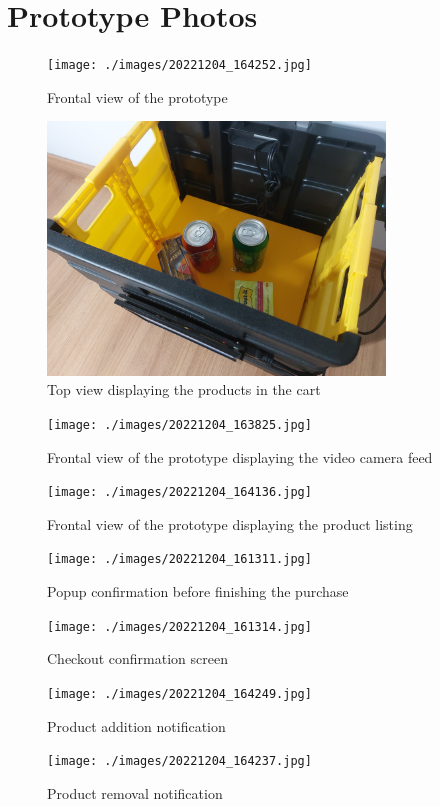 \documentclass[openright]{normas-utf-tex} %
\begin{document}
\apendice
\chapter{Prototype Photos}
\label{app:photos}

\begin{figure}[H]
	\centering
	\texttt{[image: ./images/20221204\_164252.jpg]}
	\caption[]{Frontal view of the prototype}
\end{figure}

\begin{figure}[H]
	\centering
    \includegraphics[width=0.8\textwidth]{./images/20221204_164147.jpg}
	\caption[]{Top view displaying the products in the cart}
\end{figure}

\begin{figure}[H]
	\centering
    \texttt{[image: ./images/20221204\_163825.jpg]}
	\caption[]{Frontal view of the prototype displaying the video camera feed}
\end{figure}

\begin{figure}[H]
	\centering
    \texttt{[image: ./images/20221204\_164136.jpg]}
	\caption[]{Frontal view of the prototype displaying the product listing}
\end{figure}

\begin{figure}[H]
	\centering
    \texttt{[image: ./images/20221204\_161311.jpg]}
    \caption[]{Popup confirmation before finishing the purchase}
\end{figure}

\begin{figure}[H]
	\centering
    \texttt{[image: ./images/20221204\_161314.jpg]}
	\caption[]{Checkout confirmation screen}
\end{figure}


\begin{figure}[H]
	\centering
    \texttt{[image: ./images/20221204\_164249.jpg]}
	\caption[]{Product addition notification}
\end{figure}

\begin{figure}[H]
	\centering
    \texttt{[image: ./images/20221204\_164237.jpg]}
	\caption[]{Product removal notification}
\end{figure}
\end{document}
